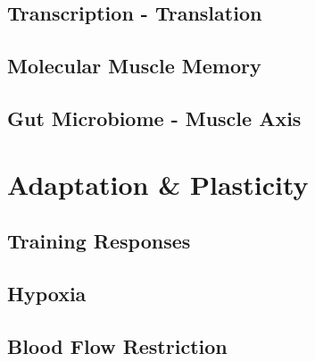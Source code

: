 \subsection{Transcription - Translation}

\subsection{Molecular Muscle Memory}

\subsection{Gut Microbiome - Muscle Axis}

\section{Adaptation \& Plasticity}

\subsection{Training Responses}

\subsection{Hypoxia}

\subsection{Blood Flow Restriction}

\printbibliography[heading=subbibintoc]